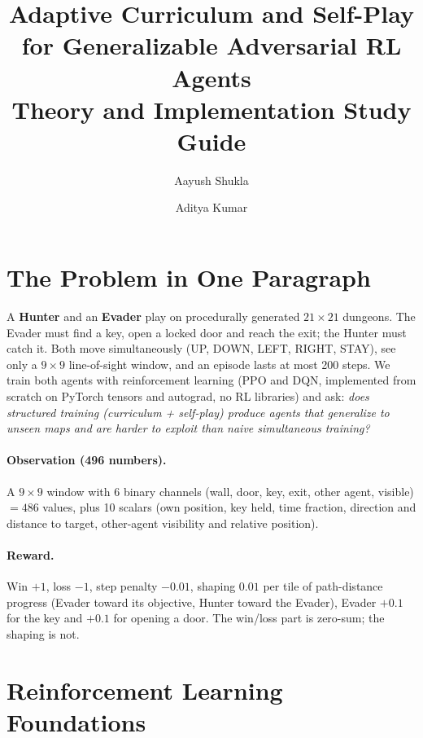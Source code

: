 \documentclass[11pt,a4paper]{article}
\title{\textbf{Adaptive Curriculum and Self-Play for Generalizable Adversarial RL Agents}\\[4pt]
\large Theory and Implementation Study Guide}
\author{Aayush Shukla \and Aditya Kumar}
\date{}
\begin{document}
\maketitle
\tableofcontents
\newpage

\section{The Problem in One Paragraph}
A \textbf{Hunter} and an \textbf{Evader} play on procedurally generated $21\times21$ dungeons.
The Evader must find a key, open a locked door and reach the exit; the Hunter must catch it.
Both move simultaneously (UP, DOWN, LEFT, RIGHT, STAY), see only a $9\times9$ line-of-sight
window, and an episode lasts at most 200 steps. We train both agents with reinforcement learning
(PPO and DQN, implemented from scratch on PyTorch tensors and autograd, no RL libraries) and ask:
\emph{does structured training (curriculum + self-play) produce agents that generalize to unseen
maps and are harder to exploit than naive simultaneous training?}

\paragraph{Observation (496 numbers).} A $9\times9$ window with 6 binary channels
(wall, door, key, exit, other agent, visible) $= 486$ values, plus 10 scalars (own position,
key held, time fraction, direction and distance to target, other-agent visibility and
relative position).

\paragraph{Reward.} Win $+1$, loss $-1$, step penalty $-0.01$, shaping $0.01$ per tile of
path-distance progress (Evader toward its objective, Hunter toward the Evader), Evader $+0.1$
for the key and $+0.1$ for opening a door. The win/loss part is zero-sum; the shaping is not.

\section{Reinforcement Learning Foundations}
\end{document}
